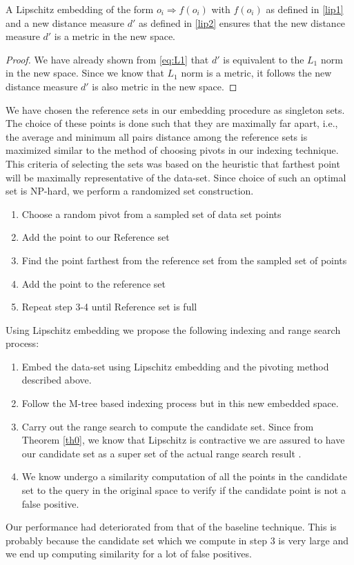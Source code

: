\begin{thm}
A Lipschitz embedding of the form $o_i \Rightarrow f(o_i)$ with $f(o_i)$ as defined in \autoref{lip1} and a new distance measure $d'$ as defined in \autoref{lip2} ensures that the new distance measure $d'$ is a metric in the new space.
\end{thm}

\begin{proof}
We have already shown from \autoref{eq:L1} that $d'$ is equivalent to the $L_1$ norm in the new space. Since we know that $L_1$ norm is a metric, it follows the new distance measure $d'$ is also metric in the new space.
\end{proof}

We have chosen the reference sets in our embedding procedure as singleton sets. The choice of these points is done such that they are maximally far apart, i.e., the average and minimum all pairs distance among the reference sets is maximized similar to the method of choosing pivots in our indexing technique. This criteria of selecting the sets was based on the heuristic that farthest point will be maximally representative of the data-set. Since choice of such an optimal set is NP-hard, we perform a randomized set construction.\\

\begin{enumerate}
	\item Choose a random pivot from a sampled set of  data set points

	\item Add the point to our Reference set

	\item Find the point farthest from the reference set from the sampled set of points

	\item Add the point to the reference set

	\item Repeat step 3-4 until Reference set is full\\
\end{enumerate}


Using Lipschitz embedding we propose the following indexing and range search process:
\begin{enumerate}
	\item Embed the data-set using Lipschitz embedding and the pivoting method described above.
	\item Follow the M-tree based indexing process but in this new embedded space.
	\item Carry out the range search to compute the candidate set.  Since from Theorem \autoref{th0}, we know that Lipschitz is contractive we are assured to have our candidate set as a super set of the actual range search result .
	\item We know undergo a similarity computation of all the points in the candidate set to the query in the original space to verify if the candidate point is not a false positive.
\end{enumerate}
Our performance had deteriorated from that of the baseline technique. This is probably because the candidate set which we compute in step 3 is very large and we end up computing similarity for a lot of false positives.
